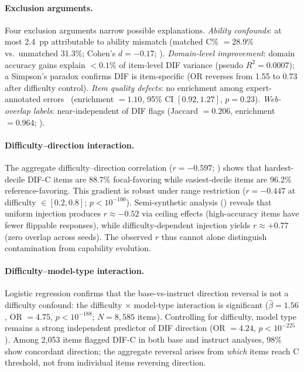 \paragraph{Exclusion arguments.}
Four exclusion arguments narrow possible explanations. \emph{Ability confounds}: at most 2.4~pp attributable to ability mismatch (matched C\% $= 28.9\%$ vs.\ unmatched 31.3\%; Cohen's $d = -0.17$; ). \emph{Domain-level improvement}: domain accuracy gains explain ${<}0.1\%$ of item-level DIF variance (pseudo $R^2 = 0.0007$); a Simpson's paradox confirms DIF is item-specific (OR reverses from 1.55 to 0.73 after difficulty control). \emph{Item quality defects}: no enrichment among expert-annotated errors~\citep{gema2024mmlu} (enrichment $= 1.10$, 95\% CI $[0.92, 1.27]$, $p = 0.23$). \emph{Web-overlap labels}: near-independent of DIF flags (Jaccard $= 0.206$, enrichment $= 0.964$; ).

\paragraph{Difficulty--direction interaction.}
The aggregate difficulty--direction correlation ($r = -0.597$; ) shows that hardest-decile DIF-C items are 88.7\% focal-favoring while easiest-decile items are 96.2\% reference-favoring. This gradient is robust under range restriction ($r = -0.447$ at difficulty $\in [0.2, 0.8]$; $p < 10^{-100}$). Semi-synthetic analysis () reveals that uniform injection produces $r \approx -0.52$ via ceiling effects (high-accuracy items have fewer flippable responses), while difficulty-dependent injection yields $r \approx +0.77$ (zero overlap across seeds). The observed $r$ thus cannot alone distinguish contamination from capability evolution.

\paragraph{Difficulty--model-type interaction.}
\label{app:interaction}
Logistic regression confirms that the base-vs-instruct direction reversal is not a difficulty confound: the difficulty $\times$ model-type interaction is significant ($\hat{\beta} = 1.56$, OR $= 4.75$, $p < 10^{-188}$; $N = 8{,}585$ items). Controlling for difficulty, model type remains a strong independent predictor of DIF direction (OR $= 4.24$, $p < 10^{-225}$). Among 2,053 items flagged DIF-C in both base and instruct analyses, 98\% show concordant direction; the aggregate reversal arises from \emph{which} items reach C threshold, not from individual items reversing direction.

